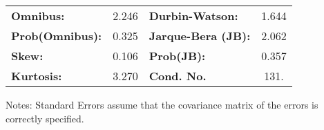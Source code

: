 \begin{center}
\begin{tabular}{lcccccc}
\bottomrule
\end{tabular}
\begin{tabular}{lclc}
\textbf{Omnibus:}       &  2.246 & \textbf{  Durbin-Watson:     } &    1.644  \\
\textbf{Prob(Omnibus):} &  0.325 & \textbf{  Jarque-Bera (JB):  } &    2.062  \\
\textbf{Skew:}          &  0.106 & \textbf{  Prob(JB):          } &    0.357  \\
\textbf{Kurtosis:}      &  3.270 & \textbf{  Cond. No.          } &     131.  \\
\bottomrule
\end{tabular}
\end{center}

Notes: \newline
 [1] Standard Errors assume that the covariance matrix of the errors is correctly specified.